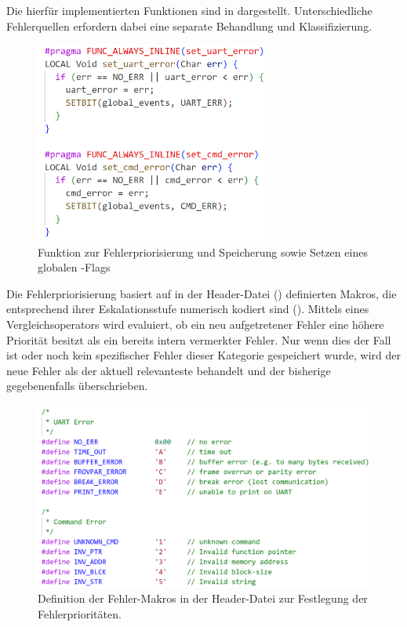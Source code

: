 \newpage
Die hierf\"ur implementierten Funktionen sind in  dargestellt. Unterschiedliche Fehlerquellen erfordern dabei eine separate Behandlung und Klassifizierung. 

\begin{figure}[h!]
	\centering
	\includegraphics[width=0.7\textwidth]{../Bilder/ObserverModule/Fehlerbehandlung_funktionen.png}
	\caption{Funktion zur Fehlerpriorisierung und Speicherung sowie Setzen eines globalen -Flags}
	\label{fig:fehlerbehandlung_funktionen}
\end{figure}

Die Fehlerpriorisierung basiert auf in der Header-Datei () definierten Makros, die entsprechend ihrer Eskalationsstufe numerisch kodiert sind (\Vgl {}). Mittels eines Vergleichsoperators wird evaluiert, ob ein neu aufgetretener Fehler eine h\"ohere Priorit\"at besitzt als ein bereits intern vermerkter Fehler. Nur wenn dies der Fall ist oder noch kein spezifischer Fehler dieser Kategorie gespeichert wurde, wird der neue Fehler als der aktuell relevanteste behandelt und der bisherige gegebenenfalls \"uberschrieben.

\begin{figure}[h!]
	\centering
	\includegraphics[width=1.0\textwidth]{../Bilder/ObserverModule/error_vectors.png}
	\caption{Definition der Fehler-Makros in der Header-Datei  zur Festlegung der Fehlerpriorit\"aten.}
	\label{fig:error_vectors}
\end{figure}

